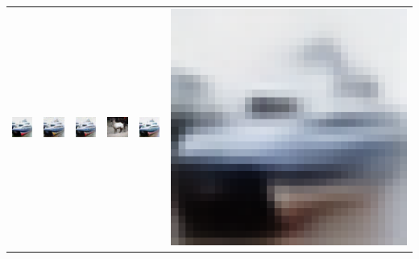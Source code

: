 \begin{table}[h!]
{\begin{tabular}{cccccc}
        \includegraphics[width=.145\textwidth]{chapter4/figures/images/cifar10/original/2.png} &   
        \includegraphics[width=.145\textwidth]{chapter4/figures/images/cifar10/reconstruction/2.png} &
        \includegraphics[width=.145\textwidth]{chapter4/figures/images/cifar10/corrected_reconstruction/2.png} &
        \includegraphics[width=.145\textwidth]{chapter4/figures/images/cifar10/diffusion_decoder_beta_0.01/2.png} &
        \includegraphics[width=.145\textwidth]{chapter4/figures/images/cifar10/diffusion_decoder_beta_0/2.png} &
        \includegraphics[width=.145\textwidth]{chapter4/figures/images/cifar10/VAE_reconstruction/2.png} \\
 

\end{tabular}}
\end{table}
